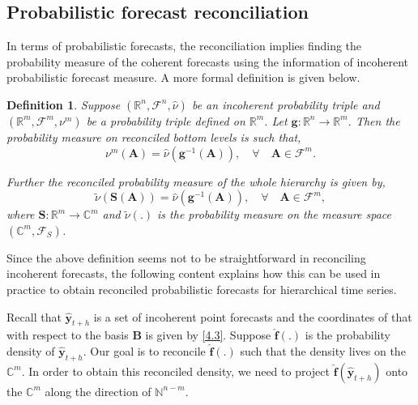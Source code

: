 \documentclass[a4paper, 11pt]{article}
\newtheorem{definition}{Definition}[section]
\begin{document}
\subsection{Probabilistic forecast reconciliation}

In terms of probabilistic forecasts, the reconciliation implies finding the probability measure of the coherent forecasts using the information of incoherent probabilistic forecast measure. A more formal definition is given below.

\begin{definition} \label{def:reconprob}
  Suppose $(\mathbb{R}^n, \mathscr{F}^n, \hat{\nu})$ be an incoherent probability triple and $(\mathbb{R}^m, \mathscr{F}^m, \nu^m)$ be a probability triple defined on $\mathbb{R}^m$. Let $\bm{g}:\mathbb{R}^n \rightarrow \mathbb{R}^m $. Then the probability measure on reconciled bottom levels is such that,
  \begin{equation}
  \nu^m(\bm{A}) = \hat{\nu}(\bm{g}^{-1}(\bm{A})), \quad \forall \quad \bm{A} \in \mathscr{F}^m.
  \end{equation}
  
  Further the reconciled probability measure of the whole hierarchy is given by,
  \begin{equation}
  \tilde{\nu}(\bm{S}(\bm{A})) = \hat{\nu}(\bm{g}^{-1}(\bm{A})), \quad \forall \quad \bm{A} \in \mathscr{F}^m,
  \end{equation}
  where $\bm{S}:\mathbb{R}^m \rightarrow \mathbb{C}^m$ and $\tilde{\nu}(.)$ is the probability measure on the measure space $(\mathbb{C}^m, \mathscr{F}_S)$.
\end{definition}

Since the above definition seems not to be straightforward in reconciling incoherent forecasts, the following content explains how this can be used in practice to obtain reconciled probabilistic forecasts for hierarchical time series.

Recall that $\hat{\bm{y}}_{t+h}$ is a set of incoherent point forecasts and the coordinates of that with respect to the basis $\bm{B}$ is given by \eqref{4.3}. Suppose $\hat{\bm{f}}(.)$ is the probability density of $\hat{\bm{y}}_{t+h}$. Our goal is to reconcile $\hat{\bm{f}}(.)$ such that the density lives on the $\mathbb{C}^m$. In order to obtain this reconciled density, we need to project $\hat{\bm{f}}(\hat{\bm{y}}_{t+h})$ onto the $\mathbb{C}^m$ along the direction of $\mathbb{N}^{n-m}$.
\end{document}
